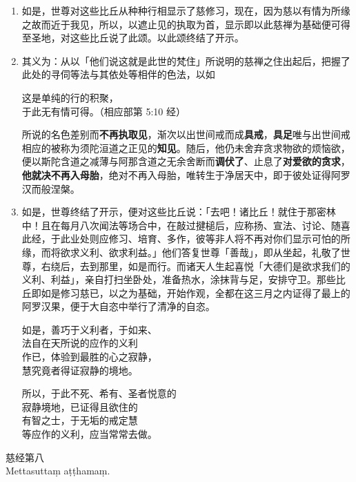 \begin{enumerate}\item 如是，世尊对这些比丘从种种行相显示了慈修习，现在，因为慈以有情为所缘之故而近于我见，所以，以遮止见的执取为首，显示即以此慈禅为基础便可得至圣地，对这些比丘说了此颂。以此颂终结了开示。
\item 其义为：从以「他们说这就是此世的梵住」所说明的慈禅之住出起后，把握了此处的寻伺等法与其依处等相伴的色法，以如\begin{quoting}这是单纯的行的积聚，\\于此无有情可得。（相应部第 5:10 经）\end{quoting}所说的名色差别而\textbf{不再执取见}，渐次以出世间戒而成\textbf{具戒}，\textbf{具足}唯与出世间戒相应的被称为须陀洹道之正见的\textbf{知见}。随后，他仍未舍弃贪求物欲的烦恼欲，便以斯陀含道之减薄与阿那含道之无余舍断而\textbf{调伏了}、止息了\textbf{对爱欲的贪求}，\textbf{他就决不再入母胎}，绝对不再入母胎，唯转生于净居天中，即于彼处证得阿罗汉而般涅槃。
\item 如是，世尊终结了开示，便对这些比丘说：「去吧！诸比丘！就住于那密林中！且在每月八次闻法等场合中，在敲过揵槌后，应称扬、宣法、讨论、随喜此经，于此业处则应修习、培育、多作，彼等非人将不再对你们显示可怕的所缘，而将欲求义利、欲求利益。」他们答复世尊「善哉」，即从坐起，礼敬了世尊，右绕后，去到那里，如是而行。而诸天人生起喜悦「大德们是欲求我们的义利、利益」，亲自打扫坐卧处，准备热水，涂抹背与足，安排守卫。那些比丘即如是修习慈已，以之为基础，开始作观，全都在这三月之内证得了最上的阿罗汉果，便于大自恣中举行了清净的自恣。\begin{quoting}如是，善巧于义利者，于如来、\\法自在天所说的应作的义利\\作已，体验到最胜的心之寂静，\\慧究竟者得证寂静的境地。\end{quoting}\begin{quoting}所以，于此不死、希有、圣者悦意的\\寂静境地，已证得且欲住的\\有智之士，于无垢的戒定慧\\等应作的义利，应当常常去做。\end{quoting}\end{enumerate}

\begin{center}\vspace{1em}慈经第八\\Mettasuttaṃ aṭṭhamaṃ.\end{center}

